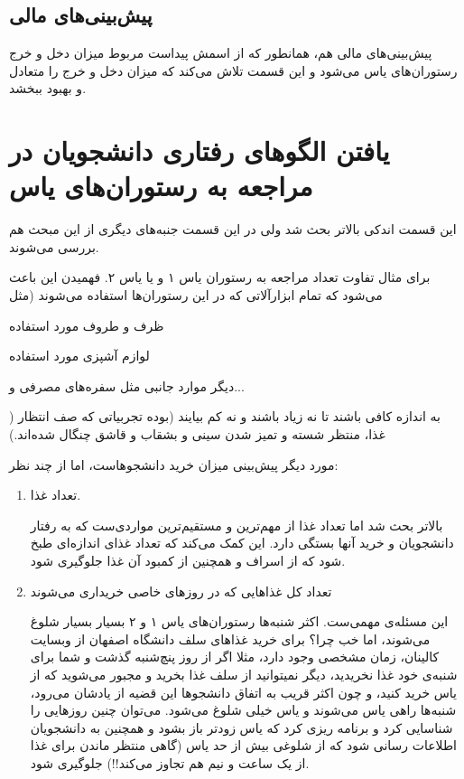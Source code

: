 \documentclass{article}
\begin{document}
	    \subsection{پیش‌بینی‌های مالی}
	    	پیش‌بینی‌های مالی هم، همانطور که از اسمش پیداست مربوط میزان دخل و خرج رستوران‌های یاس می‌شود و این قسمت تلاش می‌کند که میزان دخل و خرج را متعادل و بهبود ببخشد.
	    	
	\section{یافتن الگو‌های رفتاری دانشجویان در مراجعه به رستوران‌های یاس}
		این قسمت اندکی بالاتر بحث شد ولی در این قسمت جنبه‌های دیگری از این مبحث هم بررسی می‌شوند.
		
		برای مثال تفاوت تعداد مراجعه‌ به رستوران یاس ۱ و یا یاس ۲. فهمیدن این باعث می‌شود که تمام ابزار‌آلاتی که در این رستوران‌‌ها استفاده می‌شوند (مثل
		\begin{enumerate*}
			\item ظرف و طروف مورد استفاده
			\item لوازم آشپزی مورد استفاده 
			\item دیگر موارد جانبی مثل سفره‌های مصرفی و...
		\end{enumerate*})
	به اندازه کافی باشند تا نه زیاد باشند و نه کم بیایند (بوده تجربیاتی که صف انتظار غذا، منتظر شسته و تمیز شدن سینی و بشقاب و قاشق چنگال شده‌اند.)
	
	مورد دیگر پیش‌بینی میزان خرید دانشجو‌هاست، اما از چند نظر:
	\begin{enumerate}
		\item 
		تعداد غذا.
		
		بالاتر بحث شد اما تعداد غذا از مهم‌ترین و مستقیم‌ترین مواردی‌ست که به رفتار دانشجویان و خرید آنها بستگی دارد. این کمک می‌کند که تعداد غذای اندازه‌ای طبخ شود که از اسراف و همچنین از کمبود آن غذا جلوگیری شود.
		
		\item تعداد کل غذاهایی که در روز‌های خاصی خریداری می‌شوند
		
		این مسئله‌ی مهمی‌ست. اکثر شنبه‌ها رستوران‌های یاس ۱ و ۲ بسیار بسیار شلوغ می‌شوند، اما خب چرا؟
		برای خرید غذاهای سلف دانشگاه اصفهان از وبسایت کالینان، زمان مشخصی وجود دارد، مثلا اگر از روز پنچ‌شنبه گذشت و شما برای شنبه‌ی خود غذا نخریدید، دیگر نمیتوانید از سلف غذا بخرید و مجبور می‌شوید که از یاس خرید کنید، و چون اکثر قریب به اتفاق دانشجو‌‌ها این قضیه از یادشان می‌رود، شنبه‌ها راهی یاس می‌شوند و یاس خیلی شلوغ می‌شود. می‌توان چنین روز‌هایی را شناسایی کرد و برنامه ریزی کرد که یاس زودتر باز بشود و همچنین به دانشجویان اطلاعات رسانی شود که از شلوغی بیش از حد یاس (گاهی منتظر ماندن برای غذا از یک ساعت و نیم هم تجاوز می‌کند!!) جلوگیری شود.
	\end{enumerate}
	
\end{document}
